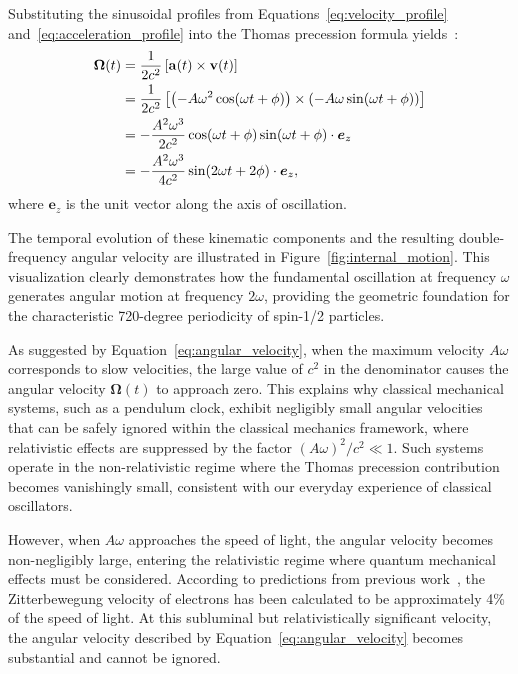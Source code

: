 \documentclass[%
 reprint,
 amsmath,amssymb,
 aps,
]{revtex4-1}
\numberwithin{equation}{section}%
\begin{document}
Substituting the sinusoidal profiles from Equations~\eqref{eq:velocity_profile} and~\eqref{eq:acceleration_profile} into the Thomas precession formula yields~\cite{hanamura2309.0047}:
\begin{align}
\boldsymbol{\Omega}(t) 
&= \frac{1}{2c^2}\left[\mathbf{a}(t) \times \mathbf{v}(t)\right] \notag\\
&= \frac{1}{2c^2} \left[ \left(-A\omega^2 \cos(\omega t + \phi)\right) \times \left(-A\omega \sin(\omega t + \phi)\right) \right] \notag\\
&= -\frac{A^2\omega^3}{2c^2} \cos(\omega t + \phi) \sin(\omega t + \phi) \cdot \boldsymbol{e}_z \notag\\
&= -\frac{A^2\omega^3}{4c^2} \sin(2\omega t + 2\phi) \cdot \boldsymbol{e}_z, \label{eq:angular_velocity}
\end{align}
where $\boldsymbol{e}_z$ is the unit vector along the axis of oscillation.

The temporal evolution of these kinematic components and the resulting double-frequency angular velocity are illustrated in Figure~\ref{fig:internal_motion}. This visualization clearly demonstrates how the fundamental oscillation at frequency $\omega$ generates angular motion at frequency $2\omega$, providing the geometric foundation for the characteristic 720-degree periodicity of spin-1/2 particles.

As suggested by Equation~\eqref{eq:angular_velocity}, when the maximum velocity $A\omega$ corresponds to slow velocities, the large value of $c^2$ in the denominator causes the angular velocity $\boldsymbol{\Omega}(t)$ to approach zero. This explains why classical mechanical systems, such as a pendulum clock, exhibit negligibly small angular velocities that can be safely ignored within the classical mechanics framework, where relativistic effects are suppressed by the factor $(A\omega)^2/c^2 \ll 1$. Such systems operate in the non-relativistic regime where the Thomas precession contribution becomes vanishingly small, consistent with our everyday experience of classical oscillators.

However, when $A\omega$ approaches the speed of light, the angular velocity becomes non-negligibly large, entering the relativistic regime where quantum mechanical effects must be considered. According to predictions from previous work~\cite{hanamura2501.0130}, the Zitterbewegung velocity of electrons has been calculated to be approximately 4\% of the speed of light. At this subluminal but relativistically significant velocity, the angular velocity described by Equation~\eqref{eq:angular_velocity} becomes substantial and cannot be ignored.
\end{document}
